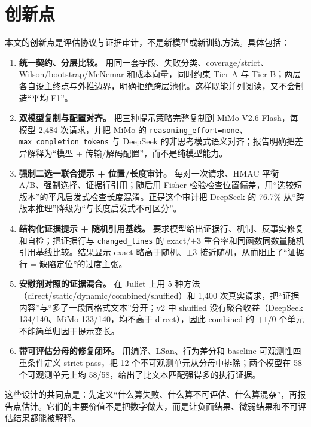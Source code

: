 \documentclass[conference]{IEEEtran}
\begin{document}
\section{创新点}
\label{sec:innovation}

本文的创新点是评估协议与证据审计，不是新模型或新训练方法。具体包括：
\begin{enumerate}
    \item \textbf{统一契约、分层比较。} 用同一套字段、失败分类、coverage/strict、Wilson/bootstrap/McNemar 和成本向量，同时约束 Tier A 与 Tier B；两层各自设主终点与外推边界，明确拒绝跨层池化。这样既能并列阅读，又不会制造“平均 F1”。
    \item \textbf{双模型复制与配置对齐。} 把三种提示策略完整复制到 MiMo-V2.6-Flash，每模型 2{,}484 次请求，并把 MiMo 的 \texttt{reasoning\_effort=none}、\texttt{max\_completion\_tokens} 与 DeepSeek 的非思考模式语义对齐；报告明确把差异解释为“模型 + 传输/解码配置”，而不是纯模型能力。
    \item \textbf{强制二选一联合提示 + 位置/长度审计。} 每对一次请求、HMAC 平衡 A/B、强制选择、证据行引用；随后用 Fisher 检验检查位置偏差，用“选较短版本”的平凡启发式检查长度混淆。正是这个审计把 DeepSeek 的 76.7\% 从“跨版本推理”降级为“与长度启发式不可区分”。
    \item \textbf{结构化证据提示 + 随机引用基线。} 要求模型给出证据行、机制、反事实修复和自检；把证据行与 \texttt{changed\_lines} 的 exact/$\pm3$ 重合率和同函数同数量随机引用基线比较。结果显示 exact 略高于随机、$\pm3$ 接近随机，从而阻止了“证据行 = 缺陷定位”的过度主张。
    \item \textbf{安慰剂对照的证据混合。} 在 Juliet 上用 5 种方法（direct/static/dynamic/combined/shuffled）和 1{,}400 次真实请求，把“证据内容”与“多了一段同格式文本”分开；v2 中 shuffled 没有聚合收益（DeepSeek 134/140、MiMo 133/140，均不高于 direct），因此 combined 的 $+1/0$ 个单元不能简单归因于提示变长。
    \item \textbf{带可评估分母的修复闭环。} 用编译、LSan、行为差分和 baseline 可观测性四重条件定义 strict pass，把 12 个不可观测单元从分母中排除；两个模型在 58 个可观测单元上均 58/58，给出了比文本匹配强得多的执行证据。
\end{enumerate}
这些设计的共同点是：先定义“什么算失败、什么算不可评估、什么算混杂”，再报告点估计。它们的主要价值不是把数字做大，而是让负面结果、微弱结果和不可评估结果都能被解释。
\end{document}
